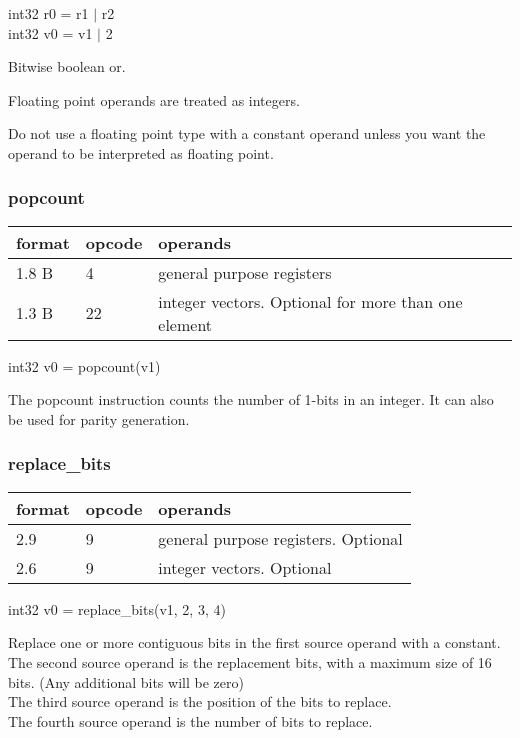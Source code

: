 \documentclass[forwardcom.tex]{subfiles}
\begin{document}
int32 r0 = r1 $|$ r2 \\
int32 v0 = v1 $|$ 2
\vspace{2mm}

Bitwise boolean or.
\vspace{2mm}

Floating point operands are treated as integers.

Do not use a floating point type with a constant operand unless you want the operand to be interpreted as floating point.


\subsubsection{popcount}
\label{table:popcountInstruction}
\begin{tabular}{|p{12mm}|p{12mm}|p{110mm}|}
\hline
\bfseries format & \bfseries opcode & \bfseries operands \\ \hline
1.8 B &  4 & general purpose registers \\ \hline
1.3 B & 22 & integer vectors. Optional for more than one element \\ \hline
\end{tabular}
\vspace{2mm}

int32 v0 = popcount(v1)
\vspace{2mm}

The popcount instruction counts the number of 1-bits in an integer. It can also be used for parity generation.
\vspace{2mm}


\subsubsection{replace\_bits}
\label{table:replaceBitsInstruction}
\begin{tabular}{|p{12mm}|p{12mm}|p{110mm}|}
\hline
\bfseries format & \bfseries opcode & \bfseries operands \\ \hline
2.9 & 9 & general purpose registers. Optional \\ \hline
2.6 & 9 & integer vectors. Optional \\ \hline
\end{tabular}
\vspace{2mm}

int32 v0 = replace\_bits(v1, 2, 3, 4) 
\vspace{2mm}

Replace one or more contiguous bits in the first source operand with a constant.\\
The second source operand is the replacement bits, with a maximum size of 16 bits. (Any additional bits will be zero)\\
The third source operand is the position of the bits to replace.\\
The fourth source operand is the number of bits to replace.
\vspace{2mm}
\end{document}
